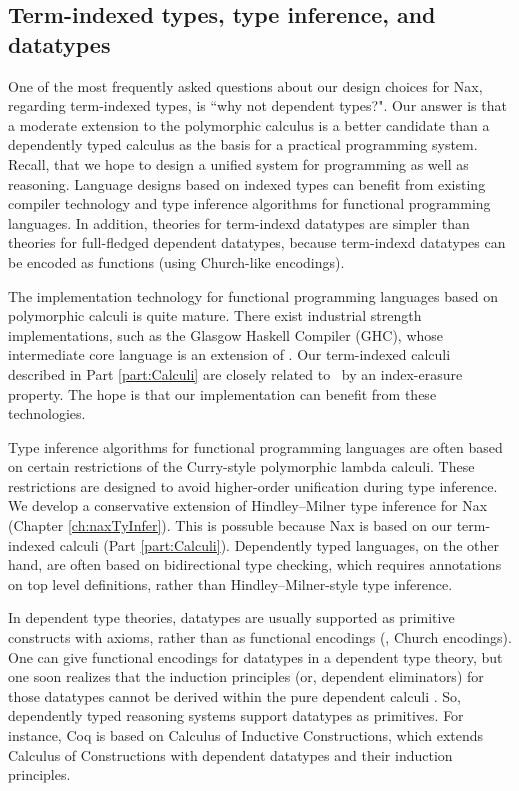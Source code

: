 \subsection{Term-indexed types, type inference, and datatypes}
\label{sec:intro:concepts:indexed}
One of the most frequently asked questions about our design choices for Nax,
regarding term-indexed types, is ``why not dependent types?". Our answer
is that a moderate extension to the polymorphic calculus is a better candidate
than a dependently typed calculus as the basis for a practical programming
system. Recall, that we hope to design a unified system for programming
as well as reasoning. Language designs based on indexed types can
benefit from existing compiler technology and type inference algorithms
for functional programming languages. In addition, theories for
term-indexd datatypes are simpler than theories for full-fledged
dependent datatypes, because term-indexd datatypes can be encoded as
functions (using Church-like encodings).

The implementation technology for functional programming languages based on
polymorphic calculi is quite mature. There exist industrial
strength implementations, such as the Glasgow Haskell Compiler (GHC),
whose intermediate core language is an extension of \Fw.
Our term-indexed calculi described in Part \ref{part:Calculi} are closely
related to \Fw\ by an index-erasure property. The hope is that
our implementation can benefit from these technologies.

Type inference algorithms for functional programming languages are often
based on certain restrictions of the Curry-style polymorphic lambda calculi.
These restrictions are designed to avoid higher-order unification during
type inference.
We develop a conservative extension of Hindley--Milner type inference for
Nax (Chapter \ref{ch:naxTyInfer}). This is possuble because Nax is based on our
term-indexed calculi (Part \ref{part:Calculi}). Dependently typed languages,
on the other hand, are often based on bidirectional type checking, which
requires annotations on top level definitions, rather than
Hindley--Milner-style type inference.

In dependent type theories, datatypes are usually supported as primitive
constructs with axioms, rather than as functional encodings
(\eg, Church encodings). One can give functional encodings for datatypes
in a dependent type theory, but one soon realizes that the induction principles
(or, dependent eliminators) for those datatypes cannot be derived within
the pure dependent calculi \cite{Geuvers01}.
So, dependently typed reasoning systems support datatypes as primitives.
For instance, Coq is based on Calculus of Inductive Constructions, which
extends Calculus of Constructions \cite{CoqHue86} with dependent datatypes
and their induction principles.

